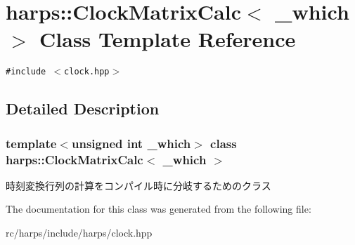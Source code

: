 \section{harps::ClockMatrixCalc$<$ \_\-which $>$ Class Template Reference}
\label{classharps_1_1ClockMatrixCalc}
{\tt \#include $<$clock.hpp$>$}



\subsection{Detailed Description}
\subsubsection*{template$<$unsigned int \_\-which$>$ class harps::ClockMatrixCalc$<$ \_\-which $>$}

時刻変換行列の計算をコンパイル時に分岐するためのクラス 

The documentation for this class was generated from the following file:\begin{CompactItemize}
\item 
rc/harps/include/harps/clock.hpp\end{CompactItemize}
